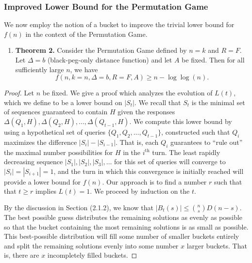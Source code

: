 \documentclass[12pt, a4paper]{article}
\newcommand{\nth}{^{\text{th}}}       %
\begin{document}
	\subsubsection{Improved Lower Bound for the Permutation Game}
	We now employ the notion of a bucket to improve the trivial lower bound for $f(n)$ in the context of the Permutation Game.
	\begin{enumerate}[label=]
		\item\textbf{Theorem 2.} Consider the Permutation Game defined by $n = k$ and $R = F$. Let $\Delta = b$ (black-peg-only distance function) and let $A$ be fixed. Then for all sufficiently large $n$, we have
		\begin{equation*}
			f(n, k = n, \Delta = b, R = F, A) \ge n - \log\log(n).
		\end{equation*}
	\end{enumerate}
	\begin{proof}
		 Let $n$ be fixed. We give a proof which analyzes the evolution of $L(t)$, which we define to be a lower bound on $|S_t|$. We recall that $S_t$ is the minimal set of sequences guaranteed to contain $H$ given the responses $\Delta(Q_1, H), \Delta(Q_2, H), \ldots, \Delta(Q_{t-1}, H)$. We compute this lower bound by using a hypothetical set of queries $\{Q_1, Q_2, \ldots, Q_{t-1}\}$, constructed such that $Q_i$ maximizes the difference $|S_{i}| - |S_{i-1}|$. That is, each $Q_i$ guarantees to ``rule out'' the maximal number possibilities for $H$ in the $i\nth$ turn. The least rapidly decreasing sequence $|S_1|, |S_2|, |S_3|, \ldots$ for this set of queries will converge to $|S_i| = |S_{i+1}| = 1$, and the turn in which this convergence is initially reached will provide a lower bound for $f(n)$. Our approach is to find a number $r$ such that that $t\ge r$ implies $L(t) = 1$. We proceed by induction on the $t$.
		 
		 By the discussion in Section (2.1.2), we know that $|B_t(s)|\le \binom{n}{s}D(n-s)$. The best possible guess distributes the remaining solutions as evenly as possible so that the bucket containing the most remaining solutions is as small as possible. This best-possible distribution will fill some number of smaller buckets entirely and split the remaining solutions evenly into some number $x$ larger buckets. That is, there are $x$ incompletely filled buckets.
	\end{proof}


\clearpage


\end{document}
